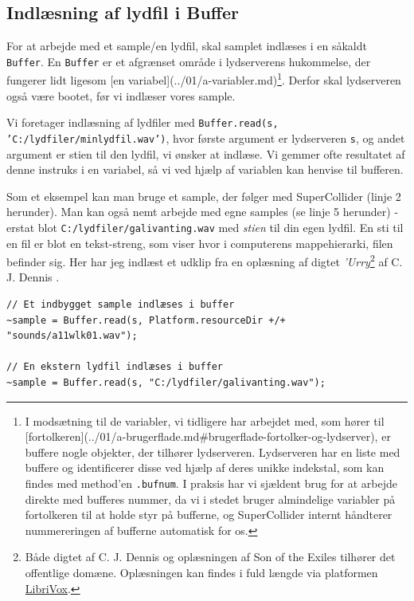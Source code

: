 \subsection{Indlæsning af lydfil i Buffer}

For at arbejde med et sample/en lydfil, skal samplet indlæses i en såkaldt \texttt{Buffer}. En \texttt{Buffer} er et afgrænset område i lydserverens hukommelse, der fungerer lidt ligesom [en variabel](../01/a-variabler.md)\footnote{I modsætning til de variabler, vi tidligere har arbejdet med, som hører til [fortolkeren](../01/a-brugerflade.md\#brugerflade-fortolker-og-lydserver), er buffere nogle objekter, der tilhører lydserveren. Lydserveren har en liste med buffere og identificerer disse ved hjælp af deres unikke indekstal, som kan findes med method'en \texttt{.bufnum}. I praksis har vi sjældent brug for at arbejde direkte med bufferes nummer, da vi i stedet bruger almindelige variabler på fortolkeren til at holde styr på bufferne, og SuperCollider internt håndterer nummereringen af bufferne automatisk for os.}. Derfor skal lydserveren også være bootet, før vi indlæser vores sample.

Vi foretager indlæsning af lydfiler med \texttt{Buffer.read(s, 'C:/lydfiler/minlydfil.wav')}, hvor første argument er lydserveren \texttt{s}, og andet argument er stien til den lydfil, vi ønsker at indlæse. Vi gemmer ofte resultatet af denne instruks i en variabel, så vi ved hjælp af variablen kan henvise til bufferen.

Som et eksempel kan man bruge et sample, der følger med SuperCollider (linje 2 herunder). Man kan også nemt arbejde med egne samples (se linje 5 herunder) - erstat blot \texttt{C:/lydfiler/galivanting.wav} med \textit{stien} til din egen lydfil. En sti til en fil er blot en tekst-streng, som viser hvor i computerens mappehierarki, filen befinder sig. Her har jeg indlæst et udklip fra en oplæsning af digtet \textit{'Urry}\footnote{Både digtet af C. J. Dennis og oplæsningen af Son of the Exiles tilhører det offentlige domæne. Oplæsningen kan findes i fuld længde via platformen \href{https://librivox.org/short-poetry-collection-142-by-various/}{LibriVox}.} af C. J. Dennis \parencite{dennis2015}.

\begin{listing}[H]
\begin{verbatim}
// Et indbygget sample indlæses i buffer
~sample = Buffer.read(s, Platform.resourceDir +/+ "sounds/a11wlk01.wav");

// En ekstern lydfil indlæses i buffer
~sample = Buffer.read(s, "C:/lydfiler/galivanting.wav");
\end{verbatim}
\caption{Indlæsning af lydfil i Buffer}
\end{listing}

